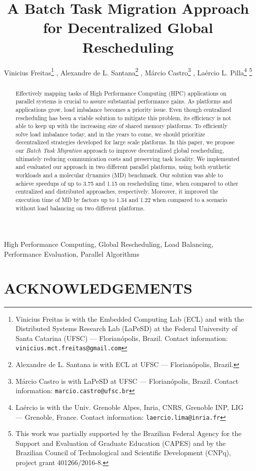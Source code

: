 \documentclass[a4paper, 10pt, twocolumn, final]{article}  %
\title{A Batch Task Migration Approach for Decentralized Global Rescheduling}
\author{
Vinicius Freitas\thanks{Vinicius Freitas is with the Embedded Computing Lab (ECL) and with the Distributed Systems Research Lab (LaPeSD) at the Federal University of Santa Catarina (UFSC) --- Florianópolis, Brazil.  Contact information: {\footnotesize \tt vinicius.mct.freitas@gmail.com}} , Alexandre de L. Santana\thanks{Alexandre de L. Santana is with ECL at UFSC --- Florianópolis, Brazil.} , Márcio Castro\thanks{Márcio Castro is with LaPeSD at UFSC --- Florianópolis, Brazil. Contact information: {\footnotesize \tt marcio.castro@ufsc.br}} , Laércio L. Pilla\thanks{Laércio is with the Univ. Grenoble Alpes, Inria, CNRS, Grenoble INP, LIG --- Grenoble, France. Contact information: {\footnotesize \tt laercio.lima@inria.fr}} \thanks{This work was partially supported by the  Brazilian Federal Agency for the Support and Evaluation of Graduate Education (CAPES) and by the Brazilian Council of Technological and Scientific Development (CNPq), project grant 401266/2016-8.}}
\begin{document}
\maketitle
\thispagestyle{empty}
\pagestyle{empty}


\begin{abstract}

  Effectively mapping tasks of High Performance Computing (HPC) applications on parallel systems is crucial to assure substantial performance gains.
  As platforms and applications grow, load imbalance becomes a priority issue. 
  Even though centralized rescheduling has been a viable solution to mitigate this problem, its efficiency is not able to keep up with the increasing size of shared memory platforms.
  To efficiently solve load imbalance today, and in the years to come, we should prioritize decentralized strategies developed for large scale platforms.
  In this paper, we propose our \textit{Batch Task Migration} approach to improve decentralized global rescheduling, ultimately reducing communication costs and preserving task locality.
  We implemented and evaluated our approach in two different parallel platforms, using both synthetic workloads and a molecular dynamics (MD) benchmark. 
  Our solution was able to achieve speedups of up to 3.75 and 1.15 on rescheduling time, when compared to other centralized and distributed approaches, respectively. 
  Moreover, it improved the execution time of MD by factors up to 1.34 and 1.22 when compared to a scenario without load balancing on two different platforms.

\end{abstract}

\begin{keywords}
High Performance Computing, Global Rescheduling, Load Balancing, Performance Evaluation, Parallel Algorithms
\end{keywords}









\section*{ACKNOWLEDGEMENTS}
\end{document}
